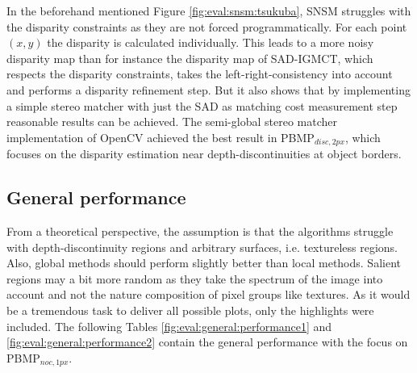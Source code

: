 \noindent In the beforehand mentioned Figure \ref{fig:eval:snsm:tsukuba}, SNSM struggles with the disparity constraints as they are not forced programmatically.
For each point $(x,y)$ the disparity is calculated individually.
This leads to a more noisy disparity map than for instance the disparity map of SAD-IGMCT, which respects the disparity constraints, takes the left-right-consistency into account and performs a disparity refinement step.
But it also shows that by implementing a simple stereo matcher with just the SAD as matching cost measurement step reasonable results can be achieved.
The semi-global stereo matcher implementation of OpenCV achieved the best result in PBMP$_{disc,2px}$, which focuses on the disparity estimation near depth-discontinuities at object borders.

\subsection{General performance}

From a theoretical perspective, the assumption is that the algorithms struggle with depth-discontinuity regions and arbitrary surfaces, i.e. textureless regions.
Also, global methods should perform slightly better than local methods.
Salient regions may a bit more random as they take the spectrum of the image into account and not the nature composition of pixel groups like textures.
As it would be a tremendous task to deliver all possible plots, only the highlights were included.
\newline\newline\noindent The following Tables \ref{fig:eval:general:performance1} and \ref{fig:eval:general:performance2} contain the general performance with the focus on PBMP$_{noc,1px}$.

\begin{table}[h!]
\centering
{}
\caption[Result table for general performance]{Result table for general performance, focusing on PBMP$_{noc,1px}$}
\label{fig:eval:general:performance1}
\end{table}

